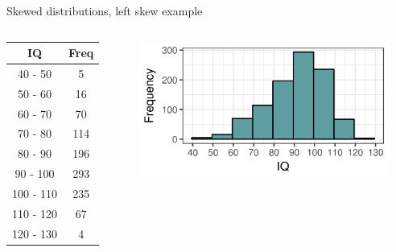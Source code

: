 \documentclass[xcolor=table, aspectratio=169, bigger]{beamer}
\begin{document}
\begin{frame}{Skewed distributions, left skew example}

\begin{columns}
\begin{column}{0.35\textwidth}
\begin{exampleblock}{}
\begin{center}
\begin{tabular}{cc}
IQ & Freq \\
\hline
40 - 50 & 5 \\
50 - 60 & 16 \\
60 - 70 & 70 \\
70 - 80 & 114 \\
80 - 90 & 196 \\
90 - 100 & 293 \\
100 - 110 & 235 \\
110 - 120 & 67 \\
120 - 130 & 4 \\
\end{tabular}
\end{center}
\end{exampleblock}
\end{column}
\pause
\begin{column}{0.65\textwidth}
\begin{center}
\includegraphics[width=3.25in]{../images/wk04_iq_left_hist}

\end{center}
\end{column}
\end{columns}

\end{frame}
\end{document}
